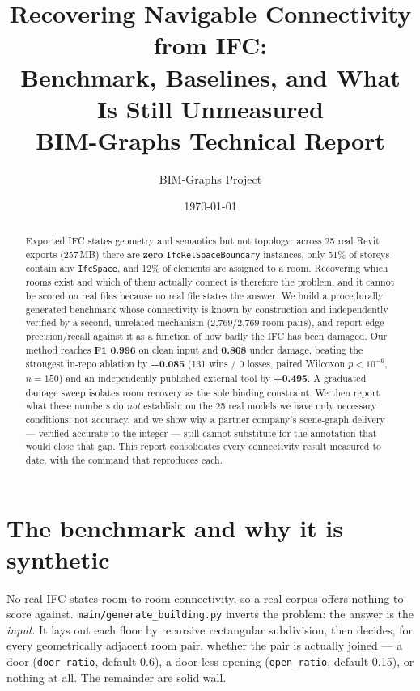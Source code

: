 \documentclass[11pt,a4paper]{article}
\title{\textbf{Recovering Navigable Connectivity from IFC:\\
Benchmark, Baselines, and What Is Still Unmeasured}\\[0.4em]
\large BIM-Graphs Technical Report}
\author{BIM-Graphs Project}
\date{\today}
\begin{document}
\maketitle

\begin{abstract}
\noindent
Exported IFC states geometry and semantics but not topology: across 25 real
Revit exports (257\,MB) there are \textbf{zero} \texttt{IfcRelSpaceBoundary}
instances, only 51\% of storeys contain any \texttt{IfcSpace}, and 12\% of
elements are assigned to a room. Recovering which rooms exist and which of them
actually connect is therefore the problem, and it cannot be scored on real
files because no real file states the answer. We build a procedurally generated
benchmark whose connectivity is known by construction and independently
verified by a second, unrelated mechanism (2{,}769/2{,}769 room pairs), and
report edge precision/recall against it as a function of how badly the IFC has
been damaged. Our method reaches \textbf{F1 0.996} on clean input and
\textbf{0.868} under damage, beating the strongest in-repo ablation by
\textbf{+0.085} (131 wins / 0 losses, paired Wilcoxon $p<10^{-6}$, $n=150$) and
an independently published external tool by \textbf{+0.495}. A graduated damage
sweep isolates room recovery as the sole binding constraint. We then report
what these numbers do \emph{not} establish: on the 25 real models we have only
necessary conditions, not accuracy, and we show why a partner company's
scene-graph delivery --- verified accurate to the integer --- still cannot
substitute for the annotation that would close that gap. This report
consolidates every connectivity result measured to date, with the command that
reproduces each.
\end{abstract}

\section{The benchmark and why it is synthetic}

No real IFC states room-to-room connectivity, so a real corpus offers nothing to
score against. \texttt{main/generate\_building.py} inverts the problem: the
answer is the \emph{input}. It lays out each floor by recursive rectangular
subdivision, then decides, for every geometrically adjacent room pair, whether
the pair is actually joined --- a door (\texttt{door\_ratio}, default 0.6), a
door-less opening (\texttt{open\_ratio}, default 0.15), or nothing at all. The
remainder are solid wall.
\end{document}

